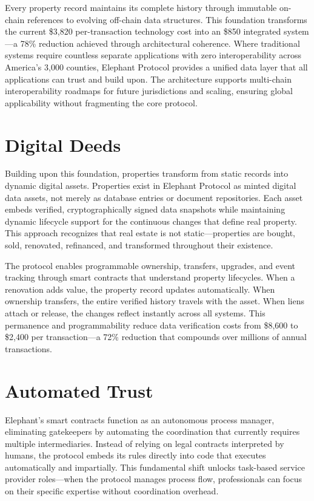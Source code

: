 Every property record maintains its complete history through immutable on-chain references to evolving off-chain data structures. This foundation transforms the current \$3,820 per-transaction technology cost into an \$850 integrated system---a 78\% reduction achieved through architectural coherence. Where traditional systems require countless separate applications with zero interoperability across America's 3,000 counties, Elephant Protocol provides a unified data layer that all applications can trust and build upon. The architecture supports multi-chain interoperability roadmaps for future jurisdictions and scaling, ensuring global applicability without fragmenting the core protocol.

\section{Digital Deeds}

Building upon this foundation, properties transform from static records into dynamic digital assets. Properties exist in Elephant Protocol as minted digital data assets, not merely as database entries or document repositories. Each asset embeds verified, cryptographically signed data snapshots while maintaining dynamic lifecycle support for the continuous changes that define real property. This approach recognizes that real estate is not static---properties are bought, sold, renovated, refinanced, and transformed throughout their existence.

The protocol enables programmable ownership, transfers, upgrades, and event tracking through smart contracts that understand property lifecycles. When a renovation adds value, the property record updates automatically. When ownership transfers, the entire verified history travels with the asset. When liens attach or release, the changes reflect instantly across all systems. This permanence and programmability reduce data verification costs from \$8,600 to \$2,400 per transaction---a 72\% reduction that compounds over millions of annual transactions.

\section{Automated Trust}

Elephant's smart contracts function as an autonomous process manager, eliminating gatekeepers by automating the coordination that currently requires multiple intermediaries. Instead of relying on legal contracts interpreted by humans, the protocol embeds its rules directly into code that executes automatically and impartially. This fundamental shift unlocks task-based service provider roles---when the protocol manages process flow, professionals can focus on their specific expertise without coordination overhead.

